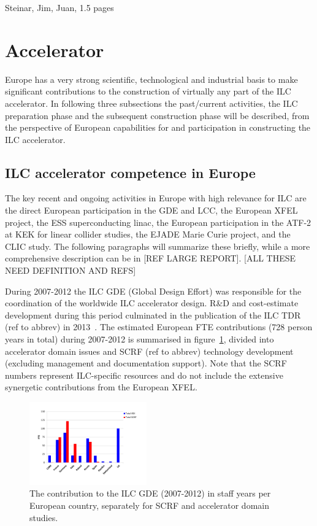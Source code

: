 \documentclass[%
 reprint,
 amsmath,amssymb,
 aps,
]{revtex4-1}
\begin{document}
Steinar, Jim, Juan, 1.5 pages

\section{\label{sec:acc}Accelerator}

Europe has a very strong scientific, technological and industrial basis
to make significant contributions to the construction of virtually any part of the ILC accelerator. 
In following three subsections the past/current activities, the ILC preparation phase and the subsequent construction phase will be described, from the perspective of European capabilities for and participation in constructing the ILC accelerator.   

\subsection{ILC accelerator competence in Europe~\label{sec:competence:accelerator}}

The key recent and ongoing activities in Europe with high relevance for ILC are the direct
European participation in the GDE and LCC,
the European XFEL project, the ESS superconducting linac, the European participation
in the ATF-2 at KEK for linear collider studies, the EJADE Marie Curie project, and the CLIC study. The following paragraphs will summarize these briefly, while a more comprehensive description can be in [REF LARGE REPORT]. [ALL THESE NEED DEFINITION AND REFS]
\vspace{0.15cm}

During 2007-2012 the ILC GDE (Global Design Effort) was responsible for the coordination of the worldwide ILC accelerator design. R\&D and cost-estimate development during this period culminated in the publication of the ILC TDR (ref to abbrev) in 2013~\cite{Behnke:2013xla}. The estimated European FTE contributions (728 person years in total) during 2007-2012 is summarised in figure~\ref{fig:PrePrep:ilcgde4}, 
divided into accelerator domain issues and SCRF (ref to abbrev) technology development (excluding management and documentation support). Note that the SCRF numbers represent ILC-specific resources and do not include the extensive synergetic contributions from the European XFEL.

\begin{figure}[htbp]
\includegraphics[width=0.45\textwidth]{figures/EU-GDE-FTE-columns-per-country.pdf}
\caption{\label{fig:PrePrep:ilcgde4} The contribution to the ILC GDE  (2007-2012) in staff years per European country, separately for SCRF and accelerator domain studies.}
\end{figure}
\end{document}
